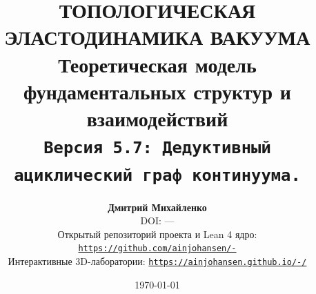 \documentclass[11pt,a4paper]{article}
\theoremstyle{definition}
\theoremstyle{remark}
\begin{document}
	
\title{\textbf{\Large ТОПОЛОГИЧЕСКАЯ ЭЛАСТОДИНАМИКА ВАКУУМА}\\
\large Теоретическая модель фундаментальных структур и взаимодействий\\[2mm]
\small \texttt{Версия 5.7: Дедуктивный ациклический граф континуума.}}

\author{\textbf{Дмитрий Михайленко}\\[1mm]
\small DOI: ---\\
\small Открытый репозиторий проекта и Lean 4 ядро: \href{https://github.com/ainjohansen/-}{\texttt{https://github.com/ainjohansen/-}}\\[0.5mm]
\small Интерактивные 3D-лаборатории: \href{https://ainjohansen.github.io/-/}{\texttt{https://ainjohansen.github.io/-/}}}

\date{\today}

\maketitle
\end{document}
